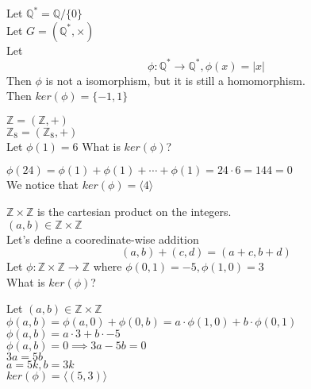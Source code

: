 \begin{eg}
    Let $\mathbb{Q}^{*} = \mathbb{Q} / \{0\}$\\
    Let $G = (\mathbb{Q}^{*}, \times)$\\
    Let \[\phi : \mathbb{Q}^{*} \rightarrow \mathbb{Q}^{*}, \phi(x) = |x|\] 
    Then $\phi$ is not a isomorphism, but it is still a homomorphism.\\
    Then $ker(\phi) = \{-1, 1\}$\\
\end{eg}

\begin{exercise}
    $\mathbb{Z} = (\mathbb{Z}, +)$\\
    $\mathbb{Z}_8 = (\mathbb{Z}_8, +)$\\
    Let $\phi(1) = 6$
    What is $ker(\phi)$?\\
\end{exercise}
\begin{answer}
    $\phi(24) = \phi(1) + \phi(1) + \cdots + \phi(1) = 24 \cdot 6 = 144 = 0$\\
    We notice that $ker(\phi) = \langle  4 \rangle$\\
\end{answer}

\begin{exercise}
    $\mathbb{Z} \times \mathbb{Z}$ is the cartesian product on the integers.\\
    $(a, b) \in \mathbb{Z} \times \mathbb{Z}$\\
    Let's define a cooredinate-wise addition
    \[(a, b) + (c, d) = (a + c, b + d)\]
    Let $\phi : \mathbb{Z} \times \mathbb{Z} \rightarrow \mathbb{Z}$ where
    $\phi(0, 1) = -5, \phi(1, 0) = 3$\\  
    What is $ker(\phi)$?\\
\end{exercise}
\begin{answer}
    Let $(a, b) \in \mathbb{Z} \times \mathbb{Z}$\\
    $\phi(a, b) = \phi(a, 0) + \phi(0, b) = a \cdot \phi(1, 0) + b \cdot \phi(0, 1)$\\
    $\phi(a, b) = a \cdot 3 + b \cdot -5$\\
    $\phi(a, b) = 0 \implies 3a - 5b = 0$\\
    $3a = 5b$\\
    $a = 5k, b = 3k$\\
    $ker(\phi) = \langle (5, 3) \rangle$\\
\end{answer}